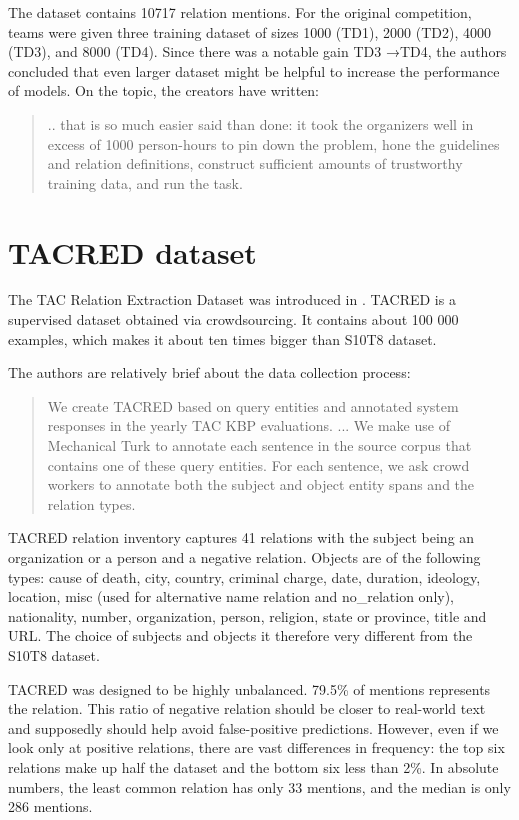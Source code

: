 The dataset contains 10717 relation mentions. For the original competition, teams were given three training dataset of sizes 1000 (TD1), 2000 (TD2), 4000 (TD3), and 8000 (TD4). Since there was a notable gain TD3 →TD4, the authors concluded that even larger dataset might be helpful to increase the performance of models. On the topic, the creators have written:

\begin{quotation}.. that is so much easier said than done: it took the organizers well in excess of 1000 person-hours to pin down the problem, hone the guidelines and
relation definitions, construct sufficient amounts of trustworthy training data, and run the task.
\end{quotation}




\section{TACRED dataset}
The TAC Relation Extraction Dataset was introduced in \cite{zhang2017tacred}. TACRED is a supervised dataset obtained via crowdsourcing. It contains about 100 000 examples, which makes it about ten times bigger than S10T8 dataset. 

The authors are relatively brief about the data collection process:

\begin{quote}
We create TACRED based on query entities and annotated system responses in the yearly TAC KBP evaluations. ... We make use of Mechanical Turk to annotate each sentence in the source corpus that contains one of these query entities. For each sentence, we ask crowd workers to annotate both the subject and object entity spans and the relation types.
\end{quote}

TACRED relation inventory captures 41 relations with the subject being an organization or a person and a negative relation. Objects are of the following types: cause of death, city, country, criminal charge, date, duration, ideology, location, misc (used for alternative name relation and no\_relation only), nationality, number, organization, person, religion, state or province, title and URL. The choice of subjects and objects it therefore very different from the S10T8 dataset.


TACRED was designed to be highly unbalanced. 79.5\% of mentions represents the   relation. This ratio of negative relation should be closer to real-world text and supposedly should help avoid false-positive predictions. However, even if we look only at positive relations, there are vast differences in frequency: the top six relations make up half the dataset and the bottom six less than 2\%. In absolute numbers, the least common  relation has only 33 mentions, and the median is only 286 mentions.
 

